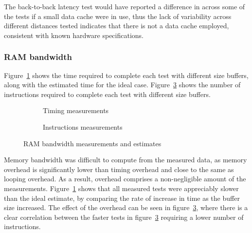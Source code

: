 \documentclass{article}
\begin{document}
The back-to-back latency test would have reported a difference in across some of the tests if a small data cache were in use, thus the lack of variability across different distances tested indicates that there is not a data cache employed, consistent with known hardware specifications.



\subsubsection{RAM bandwidth}

Figure~\ref{fig:bandwidth_time} shows the time required to complete each test with different size buffers, along with the estimated time for the ideal case. Figure~\ref{fig:bandwidth_instr} shows the number of instructions required to complete each test with different size buffers.

\begin{figure}[hp]
    \centering
    \begin{subfigure}[b]{1\textwidth}
        \centering
        
        \caption{Timing measurements}
        \label{fig:bandwidth_time}
    \end{subfigure}
    \begin{subfigure}[b]{1\textwidth}
        \centering
        
        \caption{Instructions measurements}
        \label{fig:bandwidth_instr}
    \end{subfigure}
    \caption{RAM bandwidth measurements and estimates}
\end{figure}

Memory bandwidth was difficult to compute from the measured data, as memory overhead is significantly lower than timing overhead and close to the same as looping overhead. As a result, overhead comprises a non-negligible amount of the measurements. Figure~\ref{fig:bandwidth_time} shows that all measured tests were appreciably slower than the ideal estimate, by comparing the rate of increase in time as the buffer size increased. The effect of the overhead can be seen in figure~\ref{fig:bandwidth_instr}, where there is a clear correlation between the faster tests in figure~\ref{fig:bandwidth_instr} requiring a lower number of instructions.
\end{document}
